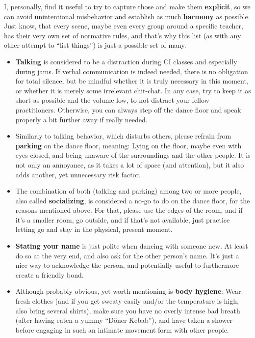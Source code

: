 I, personally, find it useful to try to capture those and make them \textbf{explicit}, so we can avoid unintentional misbehavior and establish as much \textbf{harmony} as possible.
Just know, that every scene, maybe even every group around a specific teacher, has their very own set of normative rules, and that's why this list (as with any other attempt to ``list things'') is just a possible set of many.

\begin{itemize}
    \item \textbf{Talking} is considered to be a distraction during CI classes and especially during jams.
    If verbal communication is indeed needed, there is no obligation for total silence, but be mindful whether it is truly necessary in this moment, or whether it is merely some irrelevant chit-chat.
    In any case, try to keep it as short as possible and the volume low, to not distract your fellow practitioners.
    Otherwise, you can always step off the dance floor and speak properly a bit further away if really needed.
    \item Similarly to talking behavior, which disturbs others, please refrain from \textbf{parking} on the dance floor, meaning: Lying on the floor, maybe even with eyes closed, and being unaware of the surroundings and the other people.
    It is not only an annoyance, as it takes a lot of space (and attention), but it also adds another, yet unnecessary risk factor.
    \item The combination of both (talking and parking) among two or more people, also called \textbf{socializing}, is considered a no-go to do on the dance floor, for the reasons mentioned above.
    For that, please use the edges of the room, and if it's a smaller room, go outside, and if that's not available, just practice letting go and stay in the physical, present moment.
    \item \textbf{Stating your name} is just polite when dancing with someone new.
    At least do so at the very end, and also ask for the other person's name.
    It's just a nice way to acknowledge the person, and potentially useful to furthermore create a friendly bond.
    \item Although probably obvious, yet worth mentioning is \textbf{body hygiene}: Wear fresh clothes (and if you get sweaty easily and/or the temperature is high, also bring several shirts), make sure you have no overly intense bad breath (after having eaten a yummy ``Döner Kebab''), and have taken a shower before engaging in such an intimate movement form with other people.

\end{itemize}
